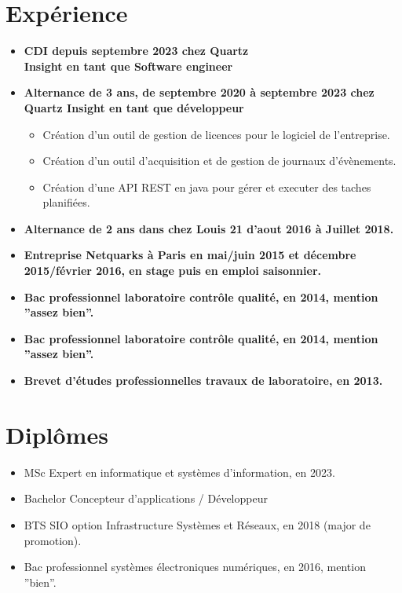 \documentclass[10pt,a4paper,oneside]{article}
\begin{document}
\begin{multicols}{2}
\section*{Expérience}
\begin{itemize}
    \item \textbf{CDI depuis septembre 2023 chez Quartz \\
      Insight en tant que Software engineer}
    \item \textbf{Alternance de 3 ans, de septembre 2020 à septembre 2023 chez Quartz Insight en tant que développeur}
    \begin{itemize}
        \item Création d’un outil de gestion de licences pour le logiciel de l’entreprise.
        \item Création d’un outil d’acquisition et de gestion de journaux d’évènements.
        \item Création d’une API REST en java pour gérer et executer des taches planifiées.
    \end{itemize}
    \item \textbf{Alternance de 2 ans dans chez Louis 21 d’aout 2016 à Juillet 2018.}
    \item \textbf{Entreprise Netquarks à Paris en mai/juin 2015 et décembre 2015/février 2016, en stage puis en emploi saisonnier.}
    \item \textbf{Bac professionnel laboratoire contrôle qualité, en 2014, mention ”assez bien”.}
    \item \textbf{Bac professionnel laboratoire contrôle qualité, en 2014, mention ”assez bien”.}
    \item \textbf{Brevet d’études professionnelles travaux de laboratoire, en 2013.}
\end{itemize}

\section*{Diplômes}
\begin{itemize}
    \item MSc Expert en informatique et systèmes d’information, en 2023.
    \item Bachelor Concepteur d’applications / Développeur
    \item BTS SIO option Infrastructure Systèmes et Réseaux, en 2018 (major de promotion).
    \item Bac professionnel systèmes électroniques numériques, en 2016, mention ”bien”.
\end{itemize}


\end{multicols}
\end{document}
